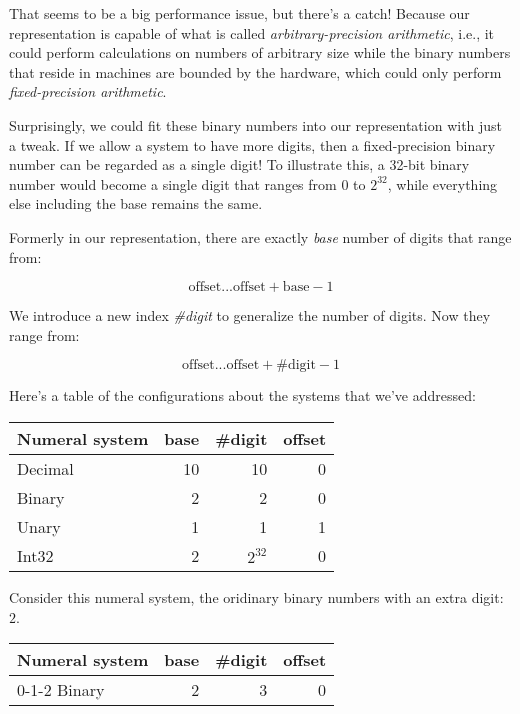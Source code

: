 \documentclass[../thesis.tex]{subfiles}
\begin{document}
That seems to be a big performance issue, but there's a catch! Because our
representation is capable of what is called \textit{arbitrary-precision arithmetic},
i.e., it could perform calculations on numbers of arbitrary size while the binary
numbers that reside in machines are bounded by the hardware, which could only
perform \textit{fixed-precision arithmetic}.

Surprisingly, we could fit these binary numbers into our representation with
just a tweak. If we allow a system to have more digits, then a fixed-precision
binary number can be regarded as a single digit! To illustrate this, a 32-bit
binary number would become a single digit that ranges from $ 0 $ to $ 2^{32} $,
while everything else including the base remains the same.

Formerly in our representation, there are exactly \textit{base} number of digits
that range from:

$$
    \text{offset}  ...  \text{offset} + \text{base} - 1
$$

We introduce a new index \textit{\#digit} to generalize the number of digits.
Now they range from:

$$
    \text{offset}  ...  \text{offset} + \text{\#digit} - 1
$$

Here's a table of the configurations about the systems that we've addressed:

\begin{center}
    \begin{tabular}{l*{3}{r}}
    Numeral system      & base  & \#digit    & offset    \\
    \hline
    Decimal             & 10    & 10        & 0         \\
    Binary              & 2     & 2         & 0         \\
    Unary               & 1     & 1         & 1         \\
    Int32               & 2     & $ 2^{32} $ & 0        \\
    \end{tabular}
\end{center}

Consider this numeral system, the oridinary binary numbers with an extra digit:
$ 2 $.

\begin{center}
    \begin{tabular}{l*{3}{r}}
    Numeral system      & base  & \#digit    & offset    \\
    \hline
    0-1-2 Binary        & 2     & 3          & 0         \\
    \end{tabular}
\end{center}
\end{document}
